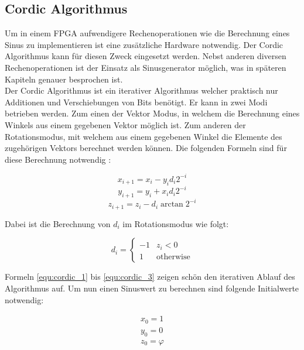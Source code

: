 \subsection{Cordic Algorithmus}\label{subsec:Cordic}

Um in einem FPGA aufwendigere Rechenoperationen wie die Berechnung eines Sinus zu implementieren ist eine zusätzliche Hardware notwendig. Der Cordic Algorithmus kann für diesen Zweck eingesetzt werden. Nebst anderen diversen Rechenoperationen ist der Einsatz als Sinusgenerator möglich, was in späteren Kapiteln genauer besprochen ist. \\
Der Cordic Algorithmus ist ein iterativer Algorithmus welcher praktisch nur Additionen und Verschiebungen von Bits benötigt. 
Er kann in zwei Modi betrieben werden. Zum einen der Vektor Modus, in welchem die Berechnung eines Winkels aus einem gegebenen Vektor möglich ist. Zum anderen der Rotationsmodus, mit welchem aus einem gegebenen Winkel die Elemente des zugehörigen Vektors berechnet werden können. Die folgenden Formeln sind für diese Berechnung notwendig \cite{Cordic}:

\begin{equation}
x_{i+1} = x_i - y_id_i2^{-i}
\label{equ:cordic_1}
\end{equation} 
\begin{equation}
y_{i+1} = y_i + x_id_i2^{-i}
\label{equ:cordic_2}
\end{equation} 
\begin{equation}
z_{i+1} = z_i - d_i\arctan{2^{-i}}
\label{equ:cordic_3}
\end{equation} 

Dabei ist die Berechnung von \(d_i\) im Rotationsmodus wie folgt: 

\begin{equation}
d_i=
\begin{cases}
-1 &z_i < 0 \\
1 &\text{otherwise}
\end{cases}
\label{equ:cordic_4}
\end{equation} 

Formeln \ref{equ:cordic_1} bis \ref{equ:cordic_3} zeigen schön den iterativen Ablauf des Algorithmus auf. Um nun einen Sinuswert zu berechnen sind folgende Initialwerte notwendig:

\begin{equation}
\begin{aligned}
x_0 = 1 \\
y_0 = 0 \\
z_0 = \varphi
\end{aligned}
\label{equ:cordic_3}
\end{equation} 


